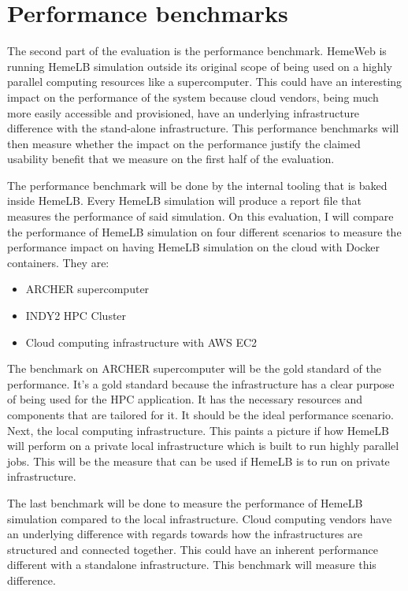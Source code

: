 
\section{Performance benchmarks}

The second part of the evaluation is the performance benchmark. HemeWeb is running HemeLB simulation outside its original scope of being used on a highly parallel computing resources like a supercomputer. This could have an interesting impact on the performance of the system because cloud vendors, being much more easily accessible and provisioned, have an underlying infrastructure difference with the stand-alone infrastructure. This performance benchmarks will then measure whether the impact on the performance justify the claimed usability benefit that we measure on the first half of the evaluation.

The performance benchmark will be done by the internal tooling that is baked inside HemeLB. Every HemeLB simulation will produce a report file that measures the performance of said simulation. On this evaluation, I will compare the performance of HemeLB simulation on four different scenarios to measure the performance impact on having HemeLB simulation on the cloud with Docker containers. They are:
\begin{itemize}
	\item{ARCHER supercomputer}
	\item{INDY2 HPC Cluster}
	\item{Cloud computing infrastructure with AWS EC2}
\end{itemize}

The benchmark on ARCHER supercomputer will be the gold standard of the performance. It's a gold standard because the infrastructure has a clear purpose of being used for the HPC application. It has the necessary resources and components that are tailored for it. It should be the ideal performance scenario. Next, the local computing infrastructure. This paints a picture if how HemeLB will perform on a private local infrastructure which is built to run highly parallel jobs. This will be the measure that can be used if HemeLB is to run on private infrastructure.

The last benchmark will be done to measure the performance of HemeLB simulation compared to the local infrastructure. Cloud computing vendors have an underlying difference with regards towards how the infrastructures are structured and connected together. This could have an inherent performance different with a standalone infrastructure. This benchmark will measure this difference.
